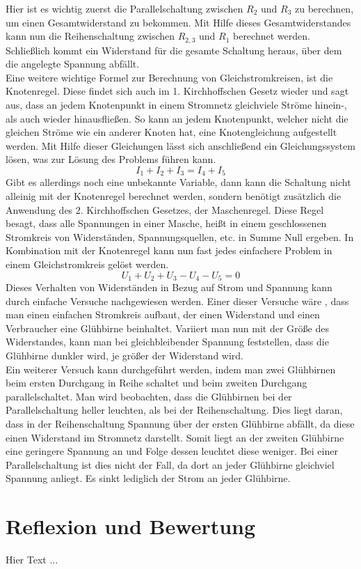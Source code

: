 Hier ist es wichtig zuerst die Parallelschaltung zwischen $R_2$ und $R_3$ zu berechnen, um einen Gesamtwiderstand zu bekommen. Mit Hilfe dieses 
Gesamtwiderstandes kann nun die Reihenschaltung zwischen $R_{2,3}$ und $R_1$ berechnet werden. Schließlich kommt ein Widerstand für die gesamte Schaltung
heraus, über dem die angelegte Spannung abfällt.\\
Eine weitere wichtige Formel zur Berechnung von Gleichstromkreisen, ist die Knotenregel. Diese findet sich auch im 1. Kirchhoffschen Gesetz wieder und sagt 
aus, dass an jedem Knotenpunkt in einem Stromnetz gleichviele Ströme hinein-, als auch wieder hinausfließen. So kann an jedem Knotenpunkt, welcher nicht 
die gleichen Ströme wie ein anderer Knoten hat, eine Knotengleichung aufgestellt werden. Mit Hilfe dieser Gleichungen lässt sich anschließend ein 
Gleichungssystem lösen, was zur Lösung des Problems führen kann.
\begin{equation}
I_1+I_2+I_3=I_4+I_5
\label{eqn:1. Kirchhoffsches Gesetz}
\end{equation}
Gibt es allerdings noch eine unbekannte Variable, dann kann die Schaltung nicht alleinig mit der Knotenregel berechnet werden, sondern benötigt zusätzlich die 
Anwendung des 2. Kirchhoffschen Gesetzes, der Maschenregel. Diese Regel besagt, dass alle Spannungen in einer Masche, heißt in einem geschlossenen Stromkreis 
von Widerständen, Spannungsquellen, etc. in Summe Null ergeben. In Kombination mit der Knotenregel kann nun fast jedes einfachere Problem in einem 
Gleichstromkreis gelöst werden.
\begin{equation}
U_1+U_2+U_3-U_4-U_5=0
\label{eqn:2. Kirchhoffsches Gesetz}
\end{equation}
Dieses Verhalten von Widerständen in Bezug auf Strom und Spannung kann durch einfache Versuche nachgewiesen werden. Einer dieser Versuche wäre \zB, dass 
man einen einfachen Stromkreis aufbaut, der einen Widerstand und einen Verbraucher \zB eine Glühbirne beinhaltet. Variiert man nun mit der Größe des 
Widerstandes, kann man bei gleichbleibender Spannung feststellen, dass die Glühbirne dunkler wird, je größer der Widerstand wird.\\ 
Ein weiterer Versuch kann durchgeführt werden, indem man zwei Glühbirnen beim ersten Durchgang in Reihe schaltet und beim zweiten Durchgang 
parallelschaltet. Man wird beobachten, dass die Glühbirnen bei der Parallelschaltung heller leuchten, als bei der Reihenschaltung. Dies liegt daran, 
dass in der Reihenschaltung Spannung über der ersten Glühbirne abfällt, da diese einen Widerstand im Stromnetz darstellt. Somit liegt an der zweiten 
Glühbirne eine geringere Spannung an und Folge dessen leuchtet diese weniger. Bei einer Parallelschaltung ist dies nicht der Fall, da dort an jeder 
Glühbirne gleichviel Spannung anliegt. Es sinkt lediglich der Strom an jeder Glühbirne. 

\section{Reflexion und Bewertung}

Hier Text ...

\clearpage
